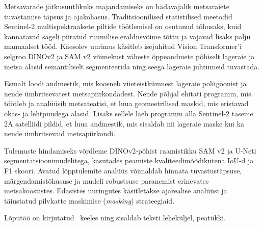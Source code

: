 Metsavarade jätkusuutlikuks majandamiseks on hädavajalik metsaraiete tuvastamise täpsus ja ajakohasus. Traditsioonilised statistilised meetodid Sentinel‑2 multispektraalsete piltide töötlemisel on osutunud tõhusaks, kuid kannatavad sageli piiratud ruumilise eraldusvõime tõttu ja vajavad lisaks palju manuaalset tööd. Käesolev uurimus käsitleb isejuhitud Vision Transformer’i selgroo DINOv2 ja  SAM v2 võimekust väheste õppeandmete põhiselt lageraie ja metsa alasid semantiliselt segmenteerida ning seega lageraie juhtumeid tuvastada.

Esmalt loodi andmestik, mis koosneb viieteistkümnest lageraie polügoonist ja nende ümbritsevatest metsapiirkondadest. Nende põhjal ehitati programm, mis töötleb ja analüüsib metsateatisi, et luua geomeetrilised maskid, mis eristavad okas- ja lehtpuudega alasid. Lisaks sellele laeb programm alla Sentinel‑2 taseme 2A satelliidi pildid, et luua andmestik, mis sisaldab nii lageraie maske kui ka nende ümbritsevaid metsapiirkondi.

Tulemuste hindamiseks võrdleme DINOv2‑põhist raamistikku SAM v2 ja U‑Neti segmentatsioonimudelitega, kasutades peamiste kvaliteedimõõdikutena IoU‑d ja F1 skoori. Avatud lõpptulemite analüüs võimaldab hinnata tuvastustäpsuse, märgendamistõhususe ja mudeli robustsuse paranemist erinevates metsakoostistes. Edasistes uuringutes käsitletakse ajarealise analüüsi ja täiustatud pilvkatte maskimise (\textit{masking}) strateegiaid.

Lõputöö on kirjutatud \langEst~keeles ning sisaldab teksti \calculatepages leheküljel, 
 peatükki.
